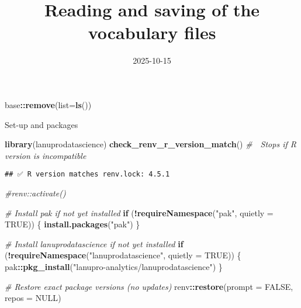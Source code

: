 \documentclass[
]{article}
\title{Reading and saving of the vocabulary files}
\author{}
\date{\vspace{-2.5em}2025-10-15}
\newenvironment{Shaded}{\begin{snugshade}}{\end{snugshade}}
\newcommand{\AttributeTok}[1]{\textcolor[rgb]{0.13,0.29,0.53}{#1}}
\newcommand{\CommentTok}[1]{\textcolor[rgb]{0.56,0.35,0.01}{\textit{#1}}}
\newcommand{\ConstantTok}[1]{\textcolor[rgb]{0.56,0.35,0.01}{#1}}
\newcommand{\ControlFlowTok}[1]{\textcolor[rgb]{0.13,0.29,0.53}{\textbf{#1}}}
\newcommand{\FunctionTok}[1]{\textcolor[rgb]{0.13,0.29,0.53}{\textbf{#1}}}
\newcommand{\NormalTok}[1]{#1}
\newcommand{\SpecialCharTok}[1]{\textcolor[rgb]{0.81,0.36,0.00}{\textbf{#1}}}
\newcommand{\StringTok}[1]{\textcolor[rgb]{0.31,0.60,0.02}{#1}}
\begin{document}
\maketitle

{
\setcounter{tocdepth}{2}
\tableofcontents
}
\begin{Shaded}
\begin{Highlighting}[]
\NormalTok{base}\SpecialCharTok{::}\FunctionTok{remove}\NormalTok{(}\AttributeTok{list=}\FunctionTok{ls}\NormalTok{())}
\end{Highlighting}
\end{Shaded}

Set-up and packages

\begin{Shaded}
\begin{Highlighting}[]
\FunctionTok{library}\NormalTok{(lanuprodatascience)}
\FunctionTok{check\_renv\_r\_version\_match}\NormalTok{() }\CommentTok{\# 🛑 Stops if R version is incompatible}
\end{Highlighting}
\end{Shaded}

\begin{verbatim}
## ✅ R version matches renv.lock: 4.5.1
\end{verbatim}

\begin{Shaded}
\begin{Highlighting}[]
\CommentTok{\#renv::activate()}

\CommentTok{\# Install \textquotesingle{}pak\textquotesingle{} if not yet installed}
\ControlFlowTok{if}\NormalTok{ (}\SpecialCharTok{!}\FunctionTok{requireNamespace}\NormalTok{(}\StringTok{"pak"}\NormalTok{, }\AttributeTok{quietly =} \ConstantTok{TRUE}\NormalTok{)) \{}
  \FunctionTok{install.packages}\NormalTok{(}\StringTok{"pak"}\NormalTok{)}
\NormalTok{\}}

\CommentTok{\# Install \textquotesingle{}lanuprodatascience\textquotesingle{} if not yet installed}
\ControlFlowTok{if}\NormalTok{ (}\SpecialCharTok{!}\FunctionTok{requireNamespace}\NormalTok{(}\StringTok{"lanuprodatascience"}\NormalTok{, }\AttributeTok{quietly =} \ConstantTok{TRUE}\NormalTok{)) \{}
\NormalTok{  pak}\SpecialCharTok{::}\FunctionTok{pkg\_install}\NormalTok{(}\StringTok{"lanupro{-}analytics/lanuprodatascience"}\NormalTok{)}
\NormalTok{\}}

\CommentTok{\# Restore exact package versions (no updates)}
\NormalTok{renv}\SpecialCharTok{::}\FunctionTok{restore}\NormalTok{(}\AttributeTok{prompt =} \ConstantTok{FALSE}\NormalTok{, }\AttributeTok{repos =} \ConstantTok{NULL}\NormalTok{)}
\end{Highlighting}
\end{Shaded}
\end{document}
